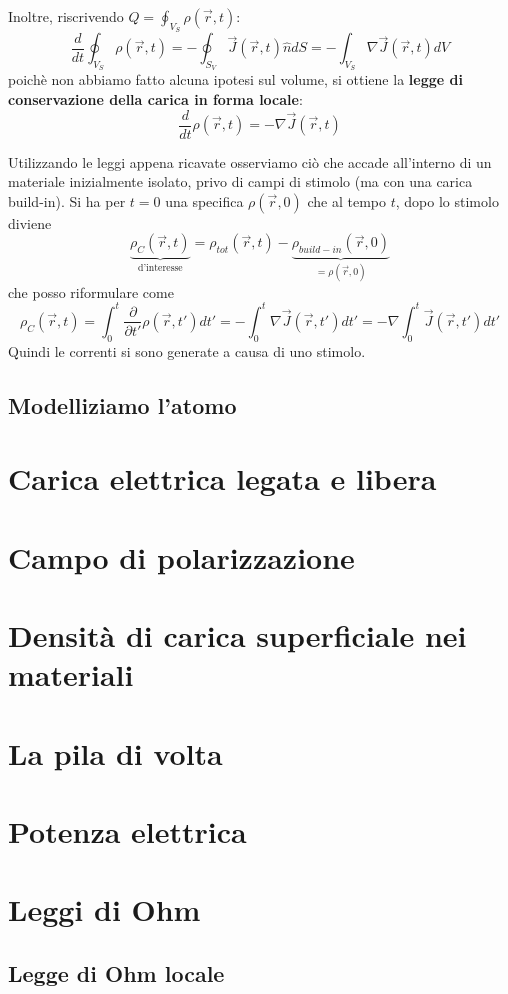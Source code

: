 \documentclass{book}
\begin{document}
Inoltre, riscrivendo $Q=\oint_{V_S}\rho(\vec{r},t)$:
\[
\displaystyle \frac{d}{dt}\oint_{V_S}\rho(\vec{r},t)=-\oint_{S_V}\vec{J}(\vec{r},t)\hat{n}dS=-\int_{V_{S}} \nabla \vec{J}(\vec{r},t) dV
\]
poichè non abbiamo fatto alcuna ipotesi sul volume, si ottiene la \textbf{legge di conservazione della carica in forma locale}:
\[
\frac{d}{dt}\rho(\vec{r},t)=-\nabla\vec{J}(\vec{r},t)
\]

Utilizzando le leggi appena ricavate osserviamo ciò che accade all'interno di un materiale inizialmente isolato, privo di campi di stimolo
(ma con una carica build-in). Si ha per $t=0$ una specifica $\rho(\vec{r},0)$ che al tempo $t$, dopo lo stimolo diviene
\[
 \underbrace{\rho_{C}(\vec{r},t)}_{\text{d'interesse}}= \rho_{tot}(\vec{r},t)- \underbrace{\rho_{build-in}(\vec{r},0)}_{=\rho(\vec{r},0)}
\]
che posso riformulare come 
\[
\rho_{C}(\vec{r},t)=\int_{0}^{t}\frac{\partial}{\partial{t'}}\rho(\vec{r},t')dt'=-\int_{0}^{t}\nabla\vec{J}(\vec{r},t')dt'=-\nabla\int_{0}^{t}\vec{J}(\vec{r},t')dt'
\]
Quindi le correnti si sono generate a causa di uno stimolo.
\subsection{Modelliziamo l'atomo}
\section{Carica elettrica legata e libera}
\section{Campo di polarizzazione}
\section{Densit\`a di carica superficiale nei materiali}
\section{La pila di volta}
\section{Potenza elettrica}
\section{Leggi di Ohm}
\subsection{Legge di Ohm locale}
\end{document}
